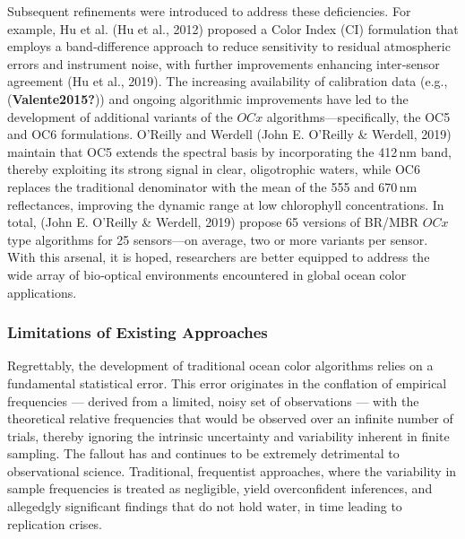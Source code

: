 \documentclass[
]{agujournal2019}
\begin{document}
Subsequent refinements were introduced to address these deficiencies.
For example, Hu et al. (Hu et al., 2012) proposed a Color Index (CI)
formulation that employs a band‑difference approach to reduce
sensitivity to residual atmospheric errors and instrument noise, with
further improvements enhancing inter‑sensor agreement (Hu et al., 2019).
The increasing availability of calibration data (e.g.,
(\textbf{Valente2015?})) and ongoing algorithmic improvements have led
to the development of additional variants of the \(OCx\)
algorithms---specifically, the OC5 and OC6 formulations. O'Reilly and
Werdell (John E. O'Reilly \& Werdell, 2019) maintain that OC5 extends
the spectral basis by incorporating the 412\,nm band, thereby exploiting
its strong signal in clear, oligotrophic waters, while OC6 replaces the
traditional denominator with the mean of the 555 and 670\,nm
reflectances, improving the dynamic range at low chlorophyll
concentrations. In total, (John E. O'Reilly \& Werdell, 2019) propose 65
versions of BR/MBR \(OCx\) type algorithms for 25 sensors---on average,
two or more variants per sensor. With this arsenal, it is hoped,
researchers are better equipped to address the wide array of bio‑optical
environments encountered in global ocean color applications.

\subsubsection{Limitations of Existing
Approaches}\label{limitations-of-existing-approaches}

Regrettably, the development of traditional ocean color algorithms
relies on a fundamental statistical error. This error originates in the
conflation of empirical frequencies --- derived from a limited, noisy
set of observations --- with the theoretical relative frequencies that
would be observed over an infinite number of trials, thereby ignoring
the intrinsic uncertainty and variability inherent in finite sampling.
The fallout has and continues to be extremely detrimental to
observational science. Traditional, frequentist approaches, where the
variability in sample frequencies is treated as negligible, yield
overconfident inferences, and allegedgly significant findings that do
not hold water, in time leading to replication crises.
\end{document}
